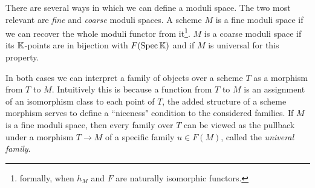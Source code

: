 There are several ways in which we can define a moduli space. The two most relevant are \textit{fine} and \textit{coarse} moduli spaces. A scheme $M$ is a fine moduli space if we can recover the whole moduli functor from it\footnote{formally, when $h_M$ and $F$ are naturally isomorphic functors.}. $M$ is a coarse moduli space if its $\mathbb{K}$-points are in bijection with $F(\mathrm{Spec}\, \mathbb{K})$ and if $M$ is universal for this property. 

In both cases we can interpret a family of objects over a scheme $T$ as a morphism from $T$ to $M$. Intuitively this is because a function from $T$ to $M$ is an assignment of an isomorphism class to each point of $T$, the added structure of a scheme morphism serves to define a ``niceness" condition to the considered families. If $M$ is a fine moduli space, then every family over $T$ can be viewed as the pullback under a morphism $T\to M$ of a specific family $u\in F(M)$, called the \textit{univeral family}.

